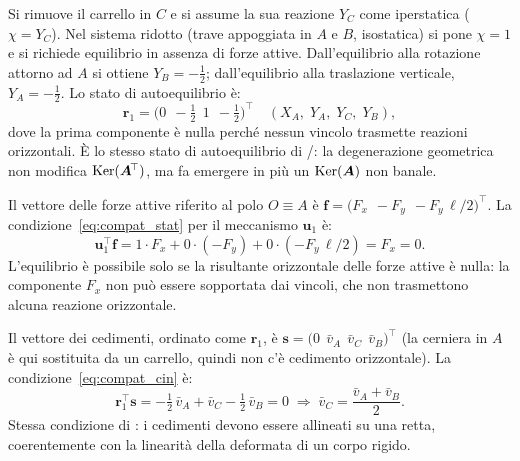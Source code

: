 \begin{esempio}
\begin{svolgimento}
		Si rimuove il carrello in $C$ e si assume la sua
		reazione $Y_C$ come iperstatica
		($\chi = Y_C$). Nel sistema ridotto (trave appoggiata
		in $A$ e $B$, isostatica) si pone $\chi = 1$ e si
		richiede equilibrio in assenza di forze attive.
		Dall'equilibrio alla rotazione attorno ad $A$ si
		ottiene
		$Y_B = -\tfrac{1}{2}$;
		dall'equilibrio alla traslazione verticale,
		$Y_A = -\tfrac{1}{2}$. Lo stato di autoequilibrio è:
		\[
		\bm{r}_1 =
		\bigl(0\,\;-\tfrac{1}{2}\,\;1\,\;-\tfrac{1}{2}\bigr)^{\!\top}
		\quad (X_A,\;Y_A,\;Y_C,\;Y_B),
		\]
		dove la prima componente è nulla perché nessun
		vincolo trasmette reazioni orizzontali. È lo stesso
		stato di autoequilibrio di
		/: la
		degenerazione geometrica non modifica $\operatorname{Ker}(\bm{A}^{\!\top})$,
		ma fa emergere in più un $\operatorname{Ker}(\bm{A})$ non banale.
		
		Il vettore delle forze attive riferito al polo
		$O \equiv A$ è
		$\bm{f} = \bigl(F_x\,\;-F_y\,\;-F_y\,\ell/2\bigr)^{\!\top}$.
		La condizione~\eqref{eq:compat_stat} per il meccanismo
		$\bm{u}_1$ è:
		\[
		\bm{u}_1^{\!\top}\bm{f}
		= 1\cdot F_x + 0\cdot(-F_y) + 0\cdot(-F_y\,\ell/2)
		= F_x = 0.
		\]
		L'equilibrio è possibile solo se la risultante
		orizzontale delle forze attive è nulla: la
		componente $F_x$ non può essere sopportata dai
		vincoli, che non trasmettono alcuna reazione
		orizzontale.
		
		Il vettore dei cedimenti, ordinato come $\bm{r}_1$,
		è $\bm{s} = \bigl(0\,\;\bar{v}_A\,\;\bar{v}_C\,\;\bar{v}_B\bigr)^{\!\top}$
		(la cerniera in $A$ è qui sostituita da un carrello,
		quindi non c'è cedimento orizzontale). La
		condizione~\eqref{eq:compat_cin} è:
		\[
		\bm{r}_1^{\!\top}\bm{s}
		= -\tfrac{1}{2}\,\bar{v}_A + \bar{v}_C
		- \tfrac{1}{2}\,\bar{v}_B = 0
		\;\Longrightarrow\;
		\bar{v}_C = \frac{\bar{v}_A + \bar{v}_B}{2}.
		\]
		Stessa condizione di : i
		cedimenti devono essere allineati su una retta,
		coerentemente con la linearità della deformata di
		un corpo rigido.
		

\end{svolgimento}
\end{esempio}
